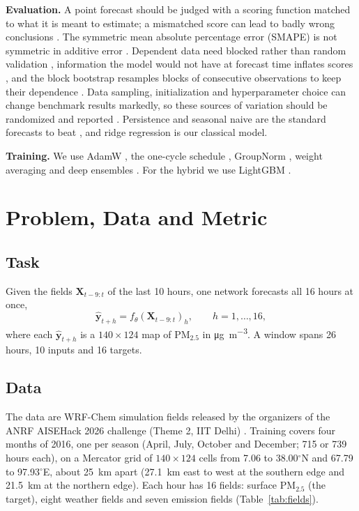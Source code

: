 \documentclass[journal]{IEEEtran}
\newcommand{\ugm}{\si{\micro\gram\per\cubic\metre}}
\newcommand{\PM}{PM$_{2.5}$}
\begin{document}
\textbf{Evaluation.} A point forecast should be judged with a scoring function matched to what it is meant to estimate; a mismatched score can lead to badly wrong conclusions \cite{gneiting2011}. The symmetric mean absolute percentage error (SMAPE) is not symmetric in additive error \cite{goodwin1999}. Dependent data need blocked rather than random validation \cite{roberts2017}, information the model would not have at forecast time inflates scores \cite{kaufman2012}, and the block bootstrap resamples blocks of consecutive observations to keep their dependence \cite{kunsch1989}. Data sampling, initialization and hyperparameter choice can change benchmark results markedly, so these sources of variation should be randomized and reported \cite{bouthillier2021}. Persistence and seasonal naive are the standard forecasts to beat \cite{hyndman2021}, and ridge regression \cite{hoerl1970} is our classical model.

\textbf{Training.} We use AdamW \cite{loshchilov2019}, the one-cycle schedule \cite{smith2019}, GroupNorm \cite{wu2018}, weight averaging \cite{polyak1992} and deep ensembles \cite{lakshminarayanan2017}. For the hybrid we use LightGBM \cite{ke2017lightgbm}.

\section{Problem, Data and Metric}
\label{sec:data}
\subsection{Task}
Given the fields $\mathbf{X}_{t-9:t}$ of the last 10 hours, one network forecasts all 16 hours at once,
\begin{equation}
\hat{\mathbf{y}}_{t+h} = f_\theta(\mathbf{X}_{t-9:t})_h, \qquad h = 1,\dots,16,
\end{equation}
where each $\hat{\mathbf{y}}_{t+h}$ is a $140\times124$ map of \PM{} in \ugm. A window spans 26 hours, 10 inputs and 16 targets.

\subsection{Data}
The data are WRF-Chem simulation fields released by the organizers of the ANRF AISEHack 2026 challenge (Theme 2, IIT Delhi) \cite{aisehack2026}. Training covers four months of 2016, one per season (April, July, October and December; 715 or 739 hours each), on a Mercator grid of $140\times124$ cells from 7.06 to 38.00$^\circ$N and 67.79 to 97.93$^\circ$E, about 25~km apart (27.1~km east to west at the southern edge and 21.5~km at the northern edge). Each hour has 16 fields: surface \PM{} (the target), eight weather fields and seven emission fields (Table~\ref{tab:fields}).
\end{document}
